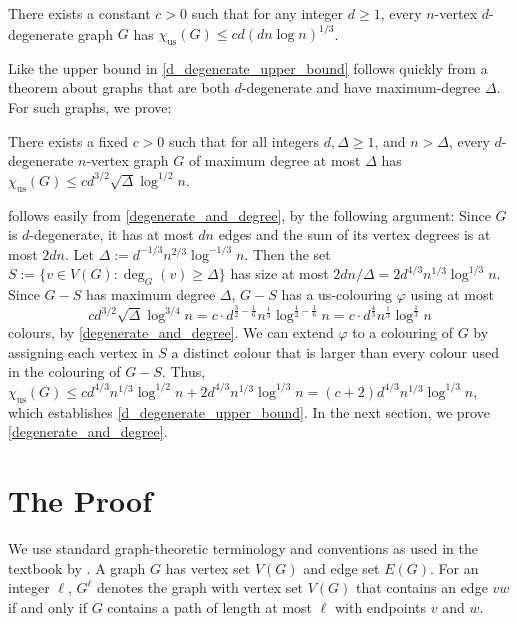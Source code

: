 \documentclass{patmorin}
\newcommand{\trn}{\chi_{\mathrm{us}}}
\begin{document}
\begin{thm}\label{d_degenerate_upper_bound}
  There exists a constant $c>0$ such that for any integer $d\ge 1$, every $n$-vertex $d$-degenerate graph $G$ has $\trn(G) \le c d(dn\log n)^{1/3}$.
\end{thm}

Like the upper bound in \cite{karpas.neiman.ea:on} \cref{d_degenerate_upper_bound} follows quickly from a theorem about graphs that are both $d$-degenerate and have maximum-degree $\Delta$. For such graphs, we prove:

\begin{thm}\label{degenerate_and_degree}
  There exists a fixed $c>0$ such that
  for all integers $d,\Delta \ge 1$, and $n> \Delta$, every $d$-degenerate $n$-vertex graph $G$ of maximum degree at most $\Delta$ has
  $\trn(G)\leq cd^{3/2}\sqrt{\Delta}\log^{1/2} n$.
\end{thm}

 follows easily from \cref{degenerate_and_degree}, by the following argument:  Since $G$ is $d$-degenerate, it has at most $dn$ edges and the sum of its vertex degrees is at most $2dn$.  Let $\Delta:=d^{-1/3}n^{2/3}\log^{-1/3} n$.  Then the set $S:=\{v\in V(G):\deg_G(v)\ge \Delta\}$ has size at most $2dn/\Delta=2d^{4/3}n^{1/3}\log^{1/3} n$.  Since $G-S$ has maximum degree $\Delta$, $G-S$ has a us-colouring $\varphi$ using at most
\[
  cd^{3/2}\sqrt{\Delta}\log^{3/4} n
  = c\cdot d^{\tfrac{3}{2}-\tfrac{1}{6}}n^{\tfrac{1}{3}}\log^{\tfrac{1}{2}-\tfrac{1}{6}} n
  = c\cdot d^{\tfrac{4}{3}}n^{\tfrac{1}{3}}\log^{\tfrac{1}{3}} n
\]
 colours, by \cref{degenerate_and_degree}. We can extend $\varphi$ to a colouring of $G$ by assigning each vertex in $S$ a distinct colour that is larger than every colour used in the colouring of $G-S$.  Thus, $\trn(G)\le cd^{4/3}n^{1/3}\log^{1/2} n+2d^{4/3}n^{1/3}\log^{1/3} n= (c+2)d^{4/3}n^{1/3}\log^{1/3} n$, which establishes \cref{d_degenerate_upper_bound}.  In the next section, we prove \cref{degenerate_and_degree}.

\section{The Proof}

We use standard graph-theoretic terminology and conventions as used in the textbook by \citet{diestel:graph}. A graph $G$ has vertex set $V(G)$ and edge set $E(G)$.  For an integer $\ell$, $G^\ell$ denotes the graph with vertex set $V(G)$ that contains an edge $vw$ if and only if $G$ contains a path of length at most $\ell$ with endpoints $v$ and $w$.
\end{document}
